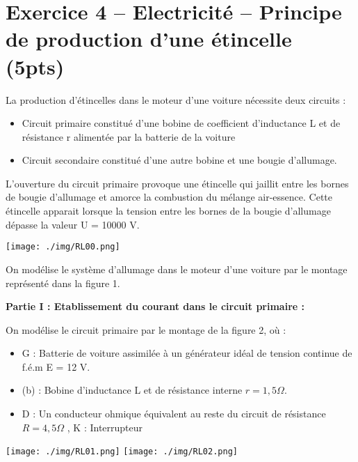 \documentclass[12pt]{article}
\begin{document}
\section*{Exercice 4 – Electricité – Principe de production d’une étincelle \dotfill(5pts)}
La production d’étincelles dans le moteur d’une voiture nécessite deux circuits :
\begin{itemize}
	\item Circuit primaire constitué d’une bobine de coefficient d’inductance L et de
résistance r alimentée par la batterie de la voiture

\item Circuit secondaire constitué d’une autre bobine et une bougie d’allumage.
\end{itemize}
L’ouverture du circuit primaire provoque une étincelle qui jaillit entre les bornes de
bougie d’allumage et amorce la combustion du mélange air-essence. Cette étincelle
apparait lorsque la tension entre les bornes de la bougie d’allumage dépasse la
valeur U = 10000 V.

\begin{center}
	\texttt{[image: ./img/RL00.png]}
	  \vspace{-0.5cm}
  \end{center}


On modélise le système d’allumage dans le moteur d’une voiture par le montage
représenté dans la figure 1.

\hspace{-1cm}\textbf{Partie I : Etablissement du courant dans le circuit primaire :  \dotfill}

On modélise le circuit primaire par le montage de la figure 2, où :

\begin{itemize}
	\item G : Batterie de voiture assimilée à un générateur
idéal de tension continue de f.é.m E = 12 V.
\item (b) : Bobine d’inductance L et de résistance
interne $r = 1,5 \Omega$.
\item D : Un conducteur ohmique équivalent au reste
du circuit de résistance $R = 4,5 \Omega$ , K : Interrupteur

\end{itemize}


\begin{center}
	\texttt{[image: ./img/RL01.png]}
	\texttt{[image: ./img/RL02.png]}
	  \vspace{-0.5cm}
  \end{center}
\end{document}
